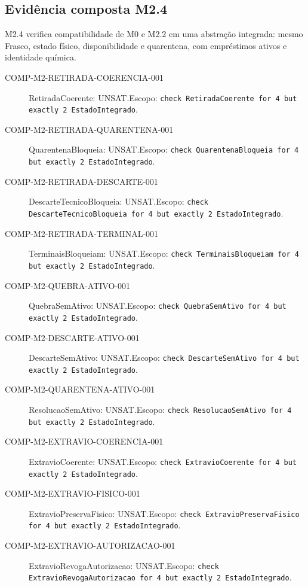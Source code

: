 \subsection*{Evidência composta M2.4}
M2.4 verifica compatibilidade de M0 e M2.2 em uma abstração integrada: mesmo Frasco, estado físico, disponibilidade e quarentena, com empréstimos ativos e identidade química.
\begin{description}
\item[COMP-M2-RETIRADA-COERENCIA-001] RetiradaCoerente: UNSAT.\newline Escopo: \texttt{check RetiradaCoerente for 4 but exactly 2 EstadoIntegrado}.
\item[COMP-M2-RETIRADA-QUARENTENA-001] QuarentenaBloqueia: UNSAT.\newline Escopo: \texttt{check QuarentenaBloqueia for 4 but exactly 2 EstadoIntegrado}.
\item[COMP-M2-RETIRADA-DESCARTE-001] DescarteTecnicoBloqueia: UNSAT.\newline Escopo: \texttt{check DescarteTecnicoBloqueia for 4 but exactly 2 EstadoIntegrado}.
\item[COMP-M2-RETIRADA-TERMINAL-001] TerminaisBloqueiam: UNSAT.\newline Escopo: \texttt{check TerminaisBloqueiam for 4 but exactly 2 EstadoIntegrado}.
\item[COMP-M2-QUEBRA-ATIVO-001] QuebraSemAtivo: UNSAT.\newline Escopo: \texttt{check QuebraSemAtivo for 4 but exactly 2 EstadoIntegrado}.
\item[COMP-M2-DESCARTE-ATIVO-001] DescarteSemAtivo: UNSAT.\newline Escopo: \texttt{check DescarteSemAtivo for 4 but exactly 2 EstadoIntegrado}.
\item[COMP-M2-QUARENTENA-ATIVO-001] ResolucaoSemAtivo: UNSAT.\newline Escopo: \texttt{check ResolucaoSemAtivo for 4 but exactly 2 EstadoIntegrado}.
\item[COMP-M2-EXTRAVIO-COERENCIA-001] ExtravioCoerente: UNSAT.\newline Escopo: \texttt{check ExtravioCoerente for 4 but exactly 2 EstadoIntegrado}.
\item[COMP-M2-EXTRAVIO-FISICO-001] ExtravioPreservaFisico: UNSAT.\newline Escopo: \texttt{check ExtravioPreservaFisico for 4 but exactly 2 EstadoIntegrado}.
\item[COMP-M2-EXTRAVIO-AUTORIZACAO-001] ExtravioRevogaAutorizacao: UNSAT.\newline Escopo: \texttt{check ExtravioRevogaAutorizacao for 4 but exactly 2 EstadoIntegrado}.

\end{description}
